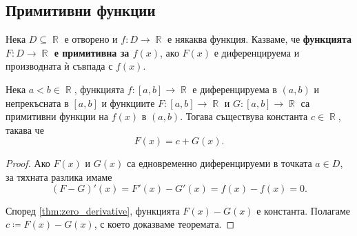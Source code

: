 \documentclass{../../common/topic}
\begin{document}
\subsection{Примитивни функции}

\begin{definition}
  Нека \( D \subseteq \BbbR \) е отворено и \( f: D \to \BbbR \) е някаква функция. Казваме, че \textbf{функцията \( F: D \to \BbbR \) е примитивна за \( f(x) \)}, ако \( F(x) \) е диференцируема и производната ѝ съвпада с \( f(x) \).
\end{definition}

\begin{theorem}
Нека \( a < b \in \BbbR \), функцията \( f: [a, b] \to \BbbR \) е диференцируема в \( (a, b) \) и непрекъсната в \( [a, b] \) и функциите \( F: [a, b] \to \BbbR \) и \( G: [a, b] \to \BbbR \) са примитивни функции на \( f(x) \) в \( (a, b) \). Тогава съществува константа \( c \in \BbbR \), такава че
  \begin{equation*}
    F(x) = c + G(x).
  \end{equation*}
\end{theorem}
\begin{proof}
  Ако \( F(x) \) и \( G(x) \) са едновременно диференцируеми в точката \( a \in D \), за тяхната разлика имаме
  \begin{equation*}
    (F - G)'(x)
    =
    F'(x) - G'(x)
    =
    f(x) - f(x)
    =
    0.
  \end{equation*}

  Според \cref{thm:zero_derivative}, функцията \( F(x) - G(x) \) е константа. Полагаме \( c \coloneqq F(x) - G(x) \), с което доказваме теоремата.
\end{proof}

\printbibliography
\end{document}
